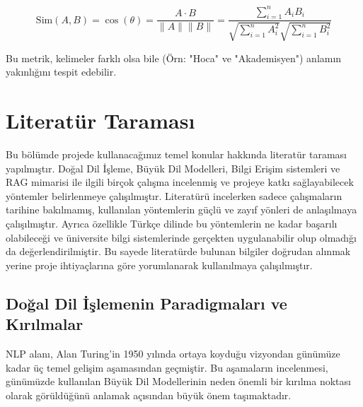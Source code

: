 \documentclass[12pt,a4paper]{report}
\begin{document}
\begin{equation}
    \text{Sim}(A, B) = \cos(\theta) = \frac{A \cdot B}{\|A\| \|B\|} = \frac{\sum_{i=1}^{n} A_i B_i}{\sqrt{\sum_{i=1}^{n} A_i^2} \sqrt{\sum_{i=1}^{n} B_i^2}}
\end{equation}

Bu metrik, kelimeler farklı olsa bile (Örn: "Hoca" ve "Akademisyen") anlamın yakınlığını tespit edebilir.

\section{Literatür Taraması}

Bu bölümde projede kullanacağımız temel konular hakkında literatür taraması yapılmıştır. Doğal Dil İşleme, Büyük Dil Modelleri, Bilgi Erişim sistemleri ve RAG mimarisi ile ilgili birçok çalışma incelenmiş ve projeye katkı sağlayabilecek yöntemler belirlenmeye çalışılmıştır. Literatürü incelerken sadece çalışmaların tarihine bakılmamış, kullanılan yöntemlerin güçlü ve zayıf yönleri de anlaşılmaya çalışılmıştır. Ayrıca özellikle Türkçe dilinde bu yöntemlerin ne kadar başarılı olabileceği ve üniversite bilgi sistemlerinde gerçekten uygulanabilir olup olmadığı da değerlendirilmiştir. Bu sayede literatürde bulunan bilgiler doğrudan alınmak yerine proje ihtiyaçlarına göre yorumlanarak kullanılmaya çalışılmıştır.

\subsection{Doğal Dil İşlemenin Paradigmaları ve Kırılmalar}
NLP alanı, Alan Turing’in 1950 yılında ortaya koyduğu vizyondan günümüze kadar üç temel gelişim aşamasından geçmiştir. Bu aşamaların incelenmesi, günümüzde kullanılan Büyük Dil Modellerinin neden önemli bir kırılma noktası olarak görüldüğünü anlamak açısından büyük önem taşımaktadır.
\end{document}
